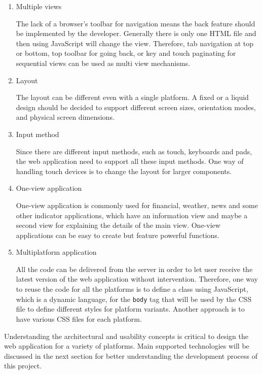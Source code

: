 \begin{enumerate}
\item Multiple views

The lack of a browser's toolbar for navigation means the back feature should be implemented by the developer. Generally there is only one HTML file and then using JavaScript will change the view. Therefore, tab navigation at top or bottom, top toolbar for going back, or key and touch paginating for sequential views can be used as multi view mechanisms.

\item Layout

The layout can be different even with a single platform. A fixed or a liquid design should be decided to support different screen sizes, orientation modes, and physical screen dimensions.

\item Input method

Since there are different input methods, such as touch, keyboards and pads, the web application need to support all these input methods. One way of handling touch devices is to change the layout for larger components.

\item One-view application

One-view application is commonly used for financial, weather, news and some other indicator applications, which have an information view and maybe a second view for explaining the details of the main view. One-view applications can be easy to create but feature powerful functions.

\item Multiplatform application

All the code can be delivered from the server in order to let user receive the latest version of the web application without intervention. Therefore, one way to reuse the code for all the platforms is to define a class using JavaScript, which is a dynamic language, for the \verb|body| tag that will be used by the CSS file to define different styles for platform variants. Another approach is to have various CSS files for each platform.
\end{enumerate}

Understanding the architectural and usability concepts is critical to design the web application for a variety of platforms. Main supported technologies will be discussed in the next section for better understanding the development process of this project.

